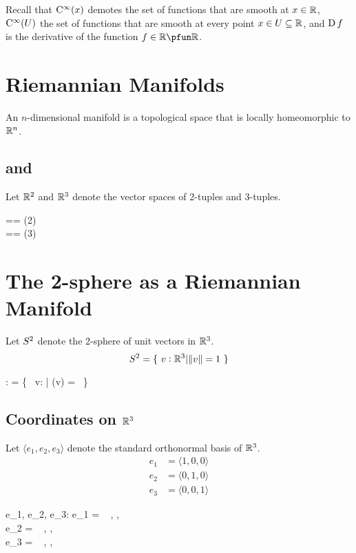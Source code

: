 \documentclass[11pt, oneside]{article}
\begin{document}
Recall that $\operatorname{C^{\infty}}(x)$ demotes the set of functions that are smooth at $x \in \mathbb{R}$, $\operatorname{C^{\infty}}(U)$ the set of functions that are smooth at
every point $x \in U \subseteq \mathbb{R}$, and $\operatorname{D} f$ is the derivative of the function $f \in \R \pfun \R$.

\section{Riemannian Manifolds}

An $n$-dimensional manifold is a topological space that is locally homeomorphic to $\mathbb{R}^n$.

\subsection{ and }

Let $\mathbb{R}^2$ and $\mathbb{R}^3$ denote the vector spaces of 2-tuples and 3-tuples.
\begin{zed}
	\Rtwo == \Rtuples(2) \\
	\Rthree == \Rtuples(3)
\end{zed}


\section{The 2-sphere as a Riemannian Manifold}

Let $S^2$ denote the 2-sphere of unit vectors in $\mathbb{R}^3$.
\begin{equation}
	S^2 = \{~ v: \mathbb{R}^3 | \norm{v} = 1 ~\}
\end{equation}

\begin{axdef}
	\Stwo: \power \Rthree
\where
	\Stwo = \{~ v: \Rthree | \normR(v) = \oneR ~\}
\end{axdef}

\subsection{Coordinates on $\mathbb{R}^3$}

Let $\langle e_1, e_2, e_3 \rangle$ denote the standard orthonormal basis of $\mathbb{R}^3$.
\begin{align}
e_1 & = \langle1, 0, 0 \rangle \\
e_2 & = \langle 0, 1, 0 \rangle \\
e_3 & = \langle 0, 0, 1 \rangle
\end{align}
\begin{axdef}
	e_1, e_2, e_3: \Rthree
\where
	e_1 = \langle~ \oneR, \zeroR, \zeroR ~\rangle \\
	e_2 = \langle~ \zeroR, \oneR, \zeroR ~\rangle \\
	e_3 = \langle~ \zeroR, \zeroR, \oneR ~\rangle
\end{axdef}
\end{document}
